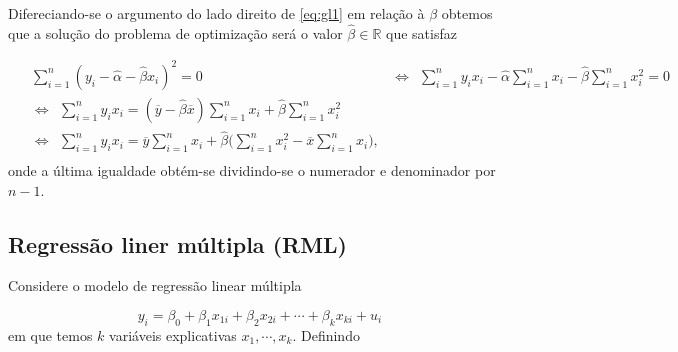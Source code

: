 \documentclass[
]{book}
\theoremstyle{definition}
\theoremstyle{definition}
\theoremstyle{definition}
\theoremstyle{remark}
\begin{document}
Difereciando-se o argumento do lado direito de \eqref{eq:gl1} em relação à \(\beta\) obtemos que a solução do problema de optimização será o valor \(\hat{\beta}\in \mathbb{R}\) que satisfaz

\begin{align*}
\nonumber  &\sum_{i=1}^n(y_i-\widehat{\alpha}-\widehat{\beta}x_i)^2 = 0  \ \ &\Longleftrightarrow \ \ \sum_{i=1}^ny_ix_i - \widehat{\alpha}\sum_{i=1}^nx_i-\widehat{\beta}\sum_{i=1}^nx_i^2 =0\\
\nonumber  \ \ &\Longleftrightarrow \ \  \sum_{i=1}^ny_ix_i = (\overline{y}-\widehat{\beta}\overline{x})\sum_{i=1}^nx_i+\widehat{\beta}\sum_{i=1}^nx_i^2 \\
\ \ &\Longleftrightarrow \ \ \sum_{i=1}^ny_ix_i = \overline{y}\sum_{i=1}^nx_i+\widehat{\beta}\bigg(\sum_{i=1}^nx_i^2-\overline{x}\sum_{i=1}^nx_i\bigg), \\
\end{align*}
onde a última igualdade obtém-se dividindo-se o numerador e denominador por \(n-1\).

\hypertarget{regressuxe3o-liner-muxfaltipla-rml}{%
\subsection{Regressão liner múltipla (RML)}\label{regressuxe3o-liner-muxfaltipla-rml}}

Considere o modelo de regressão linear múltipla

\[y_i=\beta_0+\beta_1x_{1i}+\beta_2x_{2i}+\cdots+\beta_kx_{ki}+u_i\]
em que temos \(k\) variáveis explicativas \(x_1,\cdots,x_k\).
Definindo
\end{document}
